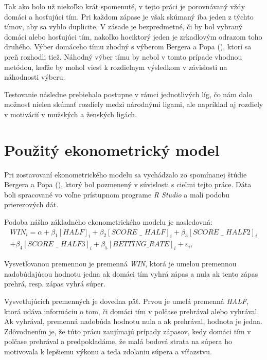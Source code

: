\documentclass[
  digital, %
  twoside, %
  notable,   %
  lof,     %
  lot,     %
]{fithesis3}
\begin{document}
		Tak ako bolo už niekoľko krát spomenuté, v tejto práci je porovnávaný vždy domáci a hosťujúci tím. Pri každom zápase je však skúmaný iba jeden z týchto tímov, aby sa vyhlo duplicite. V zásade je bezpredmetné, či by bol vybraný domáci alebo hosťujúci tím, nakoľko hociktorý jeden je zrkadlovým odrazom toho druhého. Výber domáceho tímu zhodný s výberom Bergera a Popa (\citeyear{berger2011}), ktorí sa preň rozhodli tiež. Náhodný výber tímu by nebol v tomto prípade vhodnou metódou, keďže by mohol viesť k rozdielnym výsledkom v závislosti na náhodnosti výberu.
		
		Testovanie následne prebiehalo postupne v rámci jednotlivých líg, čo nám dalo možnosť nielen skúmať rozdiely medzi národnými ligami, ale napríklad aj rozdiely v motivácií v mužských a ženských ligách.
		
		\section{Použitý ekonometrický model}
		\label{sec:pouzitymodel}
		Pri zostavovaní ekonometrického modelu sa vychádzalo zo spomínanej štúdie Bergera a Popa (\citeyear{berger2011}), ktorý bol pozmenený v súvislosti s cieľmi tejto práce. Dáta boli spracované vo voľne prístupnom programe \textit{R Studio} a mali podobu prierezových dát.
		
		Podoba nášho základného ekonometrického modelu je nasledovná:
		\begin{multline}
		WIN_{i} = \alpha + \beta _{1} [\textit{HALF}]_{i} + \beta _{2} [\textit{SCORE~\_~HALF}]_{i} + \beta _{3} [\textit{SCORE~\_~HALF2}]_{i} \\
		+ \beta _{4} [\textit{SCORE~\_~HALF3}]_{i} + \beta _{5} [\textit{BETTING\_RATE}]_{i} + \varepsilon_{i},
		\end{multline}
		
		Vysvetľovanou premennou je premenná \textit{WIN}, ktorá je umelou premennou nadobúdajúcou hodnotu jedna ak domáci tím vyhrá zápas a nula ak tento zápas prehrá, resp. zápas vyhrá súper. 
		
		Vysvetľujúcich premenných je dovedna päť. Prvou je umelá premenná \textit{HALF}, ktorá udáva informáciu o tom, či domáci tím v polčase prehrával alebo vyhrával. Ak vyhrával, premenná nadobúda hodnotu nula a ak prehrával, hodnota je jedna. Zdôvodnením je, že túto prácu zaujímajú prípady zápasov, kedy domáci tím v polčase prehrával a predpokladáme, že malá bodová strata na súpera ho motivovala k lepšiemu výkonu a teda zdolaniu súpera a víťazstvu. 
		
\end{document}
